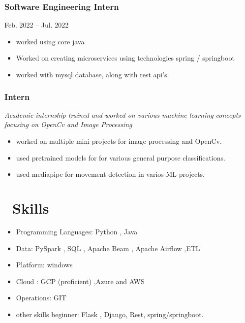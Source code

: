 \documentclass{resume}
\begin{document}
\begin{adjustwidth}{0.75cm}{0pt}
\begin{itemize}
\end{itemize}


\subsubsection*{\textbf{Software Engineering Intern}}{Feb. 2022 -- Jul. 2022}
\item  
\begin{itemize}
  \item worked using core java
  \item Worked on creating microservices using technologies spring / springboot 
  \item worked with mysql database, along with rest api's.
\end{itemize}


\end{adjustwidth}

\subsubsection*{\textbf{Intern}}
\textit{Academic internship trained and worked on various machine learning concepts focusing on OpenCv and Image Processing }
\begin{itemize}
  \item worked on multiple mini projects for image processing and OpenCv. 
  \item used pretrained models for for various general purpose classifications.
  \item used mediapipe for movement detection in varios ML projects. 
\end{itemize}


\section{\faCogs\ Skills}
\begin{itemize}[parsep=0.5ex]
  \item Programming Languages: Python , Java
  \item Data: PySpark , SQL , Apache Beam , Apache Airflow ,ETL
  \item Platform: windows
  \item Cloud : GCP (proficient) ,Azure and AWS 
  \item Operations: GIT
  \item other skills beginner: Flask , Django, Rest, spring/springboot.
\end{itemize}
\end{document}
